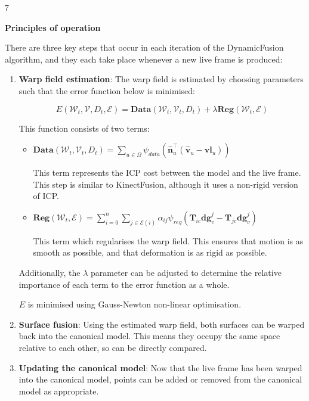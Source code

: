 \documentclass[a4paper]{article}
\begin{document}
7

\noindent\textbf{Principles of operation}


There are three key steps that occur in each iteration of the DynamicFusion algorithm, and they each take place whenever a new live frame is produced:

\begin{enumerate}
\item \textbf{Warp field estimation}: The warp field is estimated by choosing parameters such that the error function below is minimised:

$$E(\mathcal{W}_t, \mathcal{V}, D_t, \mathcal{E}) = \textbf{Data}(\mathcal{W}_t, \mathcal{V}_t, D_t) + \lambda\textbf{Reg}(\mathcal{W}_t, \mathcal{E})$$ 

This function consists of two terms:
\begin{itemize}
\item $\textbf{Data}(\mathcal{W}_t, \mathcal{V}_t, D_t) = \sum\limits_{u \in \Omega} \psi_{data}(\hat{\textbf{n}}_u^\top (\hat{\textbf{v}}_u - \textbf{vl}_u))$ 

This term represents the ICP cost between the model and the live frame. This step is similar to KinectFusion, although it uses a non-rigid version of ICP.

\item $\textbf{Reg}(\mathcal{W}_t, \mathcal{E}) = \sum\limits_{i=0}^n\sum\limits_{j \in \mathcal{E}(i)}\alpha_{ij}\psi_{reg}(\textbf{T}_{ic}\textbf{dg}^j_v - \textbf{T}_{jc}\textbf{dg}^j_v)$ 

This term which regularises the warp field. This ensures that motion is as smooth as possible, and that deformation is as rigid as possible.
\end{itemize}

Additionally, the $\lambda$ parameter can be adjusted to determine the relative importance of each term to the error function as a whole.

$E$ is minimised using Gauss-Newton non-linear optimisation.

\item \textbf{Surface fusion}: Using the estimated warp field, both surfaces can be warped back into the canonical model. This means they occupy the same space relative to each other, so can be directly compared.

\item \textbf{Updating the canonical model}: Now that the live frame has been warped into the canonical model, points can be added or removed from the canonical model as appropriate.
\end{enumerate}
\end{document}
